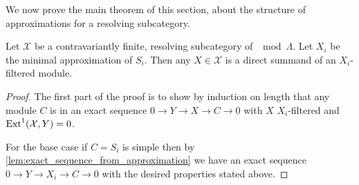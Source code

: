 We now prove the main theorem of this section, about the structure of approximations for a resolving subcategory.

\begin{theorem} \cite[3.8]{AR91}
	Let $\mathcal X$ be a contravariantly finite, resolving subcategory of $\mod \Lambda$. Let $X_i$ be the minimal approximation of $S_i$. Then any $X \in \mathcal X$ is a direct summand of an $X_i$-filtered module.
	\begin{proof}
		The first part of the proof is to show by induction on length that any module $C$ is in an exact sequence $0 \to Y \to X \to C \to 0$ with $X$ $X_i$-filtered and $\operatorname{Ext}^1(\mathcal X, Y)=0$.
		
		For the base case if $C=S_i$ is simple then by \cref{lem:exact_sequence_from_approximation} we have an exact sequence $0 \to Y \to X_i \to C \to 0$ with the desired properties stated above. 
		

\end{proof}
\end{theorem}
